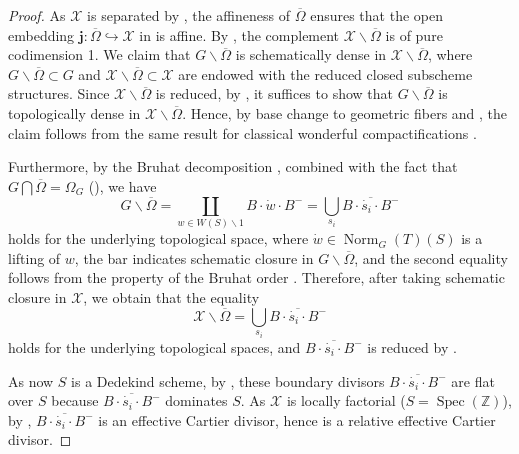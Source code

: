 \documentclass[11pt, reqno]{amsart}
\theoremstyle{plain}
\theoremstyle{definition}
\DeclareMathOperator{\Norm}{Norm}	%
\DeclareMathOperator{\Spec}{Spec}		%
\begin{document}
\begin{proof}
   As $\mathcal{X}$ is separated by , the affineness of $\overline{\Omega}$ ensures that the open embedding $\mathbf{j}\colon\overline{\Omega}\hookrightarrow\mathcal{X}$ in  is affine. By \cite[corollaire~21.12.7]{EGAIV4}, the complement $\mathcal{X}\backslash \overline{\Omega}$ is of pure codimension 1.
   We claim that $G\backslash \overline{\Omega}$ is schematically dense in $\mathcal{X}\backslash \overline{\Omega}$, where $G\backslash \overline{\Omega}\subset G$ and $\mathcal{X}\backslash \overline{\Omega} \subset \mathcal{X}$ are endowed with the reduced closed subscheme structures. Since $\mathcal{X}\backslash \overline{\Omega}$ is reduced, by \cite[Remark~9.20 (1)]{GortzWedhorn}, it suffices to show that $G\backslash \overline{\Omega}$ is topologically dense in $\mathcal{X}\backslash \overline{\Omega}$. Hence, by base change to geometric fibers and , the claim follows from the same result for classical wonderful compactifications \cite[Chapter~6, proof of Lemma~6.1.9]{BrionKumar}. 
   
   Furthermore, by the Bruhat decomposition \cite[exposé~XXII, théorème~5.7.4~(i)]{SGA3III}, combined with the fact that $G\bigcap \overline{\Omega}=\Omega_G$ (), we have
   $$G\backslash\overline{\Omega}=\coprod_{w\in W(S)\backslash 1} B\cdot \dot{w} \cdot B^-=\bigcup_{s_i}\overline{B\cdot \dot{s_i} \cdot B^-}$$
   holds for the underlying topological space, where $\dot{w}\in \Norm_G(T)(S)$ is a lifting of $w$, the bar indicates schematic closure in $G\backslash \overline{\Omega}$, and the second equality follows from the property of the Bruhat order \cite[8.5.4, Proposition~8.5.5]{linearalgrpSpringer}. Therefore, after taking schematic closure in $\mathcal{X}$, we obtain that the equality $$\mathcal{X}\backslash\overline{\Omega}=\bigcup_{s_i }\overline{B\cdot \dot{s_i} \cdot B^-}$$
   holds for the underlying topological spaces, and $\overline{B\cdot \dot{s_i} \cdot B^-}$ is reduced by \cite[Remark~10.32]{GortzWedhorn}.

   As now $S$ is a Dedekind scheme, by \cite[Chapter~III, Proposition~9.7]{HartshorneGTM52}, these boundary divisors $\overline{B\cdot \dot{s_i} \cdot B^-}$ are flat over $S$ because $\overline{B\cdot \dot{s_i} \cdot B^-}$ dominates $S$. As $\mathcal{X}$ is locally factorial ($S=\Spec(\mathbb{Z})$), by \cite[Chapter~II, Proposition~6.11]{HartshorneGTM52}, $\overline{B\cdot \dot{s_i} \cdot B^-}$ is an effective Cartier divisor, hence is a relative effective Cartier divisor. 
\end{proof}
\end{document}
